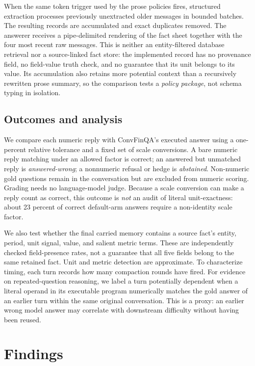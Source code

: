 \documentclass[conference,a4paper]{IEEEtran}
\begin{document}
When the same token trigger used by the prose policies fires, structured extraction processes previously unextracted older messages in bounded batches. The resulting records are accumulated and exact duplicates removed. The answerer receives a pipe-delimited rendering of the fact sheet together with the four most recent raw messages. This is neither an entity-filtered database retrieval nor a source-linked fact store: the implemented record has no provenance field, no field-value truth check, and no guarantee that its unit belongs to its value. Its accumulation also retains more potential context than a recursively rewritten prose summary, so the comparison tests a \emph{policy package}, not schema typing in isolation.

\subsection{Outcomes and analysis}

We compare each numeric reply with ConvFinQA's executed answer using a one-percent relative tolerance and a fixed set of scale conversions. A bare numeric reply matching under an allowed factor is correct; an answered but unmatched reply is \emph{answered-wrong}; a nonnumeric refusal or hedge is \emph{abstained}. Non-numeric gold questions remain in the conversation but are excluded from numeric scoring. Grading needs no language-model judge. Because a scale conversion can make a reply count as correct, this outcome is \emph{not} an audit of literal unit-exactness: about 23 percent of correct default-arm answers require a non-identity scale factor.

We also test whether the final carried memory contains a source fact's entity, period, unit signal, value, and salient metric terms. These are independently checked field-presence rates, not a guarantee that all five fields belong to the same retained fact. Unit and metric detection are approximate. To characterize timing, each turn records how many compaction rounds have fired. For evidence on repeated-question reasoning, we label a turn potentially dependent when a literal operand in its executable program numerically matches the gold answer of an earlier turn within the same original conversation. This is a proxy: an earlier wrong model answer may correlate with downstream difficulty without having been reused.

\section{Findings}
\end{document}
